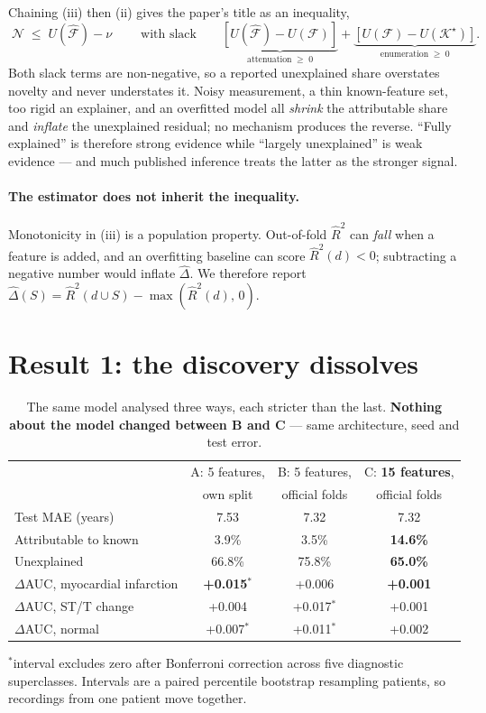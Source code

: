 \documentclass{article}
\begin{document}
Chaining (iii) then (ii) gives the paper's title as an inequality,
\[
\boxed{\;\mathcal{N} \;\le\; U(\hat{\mathcal{F}}) - \nu\;}
\qquad\text{with slack}\qquad
\underbrace{\left[U(\hat{\mathcal{F}}) - U(\mathcal{F})\right]}_{\text{attenuation}\;\ge\;0}
+
\underbrace{\left[U(\mathcal{F}) - U(\mathcal{K}^\star)\right]}_{\text{enumeration}\;\ge\;0} .
\]
Both slack terms are non-negative, so a reported unexplained share overstates
novelty and never understates it. Noisy measurement, a thin known-feature set,
too rigid an explainer, and an overfitted model all \emph{shrink} the
attributable share and \emph{inflate} the unexplained residual; no mechanism
produces the reverse. ``Fully explained'' is therefore strong evidence while
``largely unexplained'' is weak evidence --- and much published inference treats
the latter as the stronger signal.

\paragraph{The estimator does not inherit the inequality.} Monotonicity in
(iii) is a population property. Out-of-fold $\hat{R}^2$ can \emph{fall} when a
feature is added, and an overfitting baseline can score $\hat{R}^2(d) < 0$;
subtracting a negative number would inflate $\hat\Delta$. We therefore report
$\hat\Delta(S) = \hat{R}^2(d \cup S) - \max(\hat{R}^2(d),\, 0)$.

\section{Result 1: the discovery dissolves}
\label{sec:dissolves}

\begin{table}[t]
\centering
\caption{The same model analysed three ways, each stricter than the last.
\textbf{Nothing about the model changed between B and C} --- same architecture,
seed and test error.}
\label{tab:dissolve}
\small
\begin{tabular}{lccc}
\toprule
& A: 5 features, & B: 5 features, & C: \textbf{15 features}, \\
& own split & official folds & official folds \\
\midrule
Test MAE (years) & 7.53 & 7.32 & 7.32 \\
Attributable to known & 3.9\% & 3.5\% & \textbf{14.6\%} \\
Unexplained & 66.8\% & 75.8\% & \textbf{65.0\%} \\
$\Delta$AUC, myocardial infarction & \textbf{+0.015}$^{*}$ & +0.006 & \textbf{+0.001} \\
$\Delta$AUC, ST/T change & +0.004 & +0.017$^{*}$ & +0.001 \\
$\Delta$AUC, normal & +0.007$^{*}$ & +0.011$^{*}$ & +0.002 \\
\bottomrule
\end{tabular}
\vspace{2pt}
\footnotesize $^{*}$interval excludes zero after Bonferroni correction across
five diagnostic superclasses. Intervals are a paired percentile bootstrap
resampling patients, so recordings from one patient move together.
\end{table}
\end{document}
